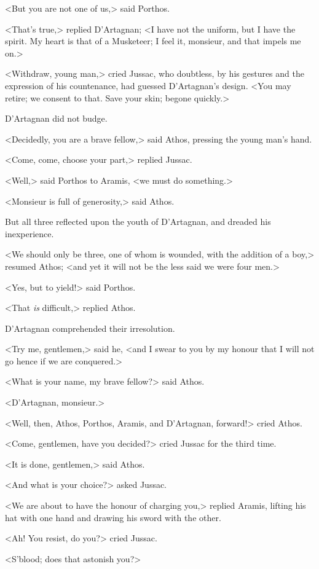 <But you are not one of us,> said Porthos. 

<That's true,> replied D'Artagnan; <I have not the uniform, but I have the spirit. My heart is that of a Musketeer; I feel it, monsieur, and that impels me on.> 

<Withdraw, young man,> cried Jussac, who doubtless, by his gestures and the expression of his countenance, had guessed D'Artagnan's design. <You may retire; we consent to that. Save your skin; begone quickly.> 

D'Artagnan did not budge. 

<Decidedly, you are a brave fellow,> said Athos, pressing the young man's hand. 

<Come, come, choose your part,> replied Jussac. 

<Well,> said Porthos to Aramis, <we must do something.> 

<Monsieur is full of generosity,> said Athos. 

But all three reflected upon the youth of D'Artagnan, and dreaded his inexperience. 

<We should only be three, one of whom is wounded, with the addition of a boy,> resumed Athos; <and yet it will not be the less said we were four men.> 

<Yes, but to yield!> said Porthos. 

<That \emph{is} difficult,> replied Athos. 

D'Artagnan comprehended their irresolution. 

<Try me, gentlemen,> said he, <and I swear to you by my honour that I will not go hence if we are conquered.> 

<What is your name, my brave fellow?> said Athos. 

<D'Artagnan, monsieur.> 

<Well, then, Athos, Porthos, Aramis, and D'Artagnan, forward!> cried Athos. 

<Come, gentlemen, have you decided?> cried Jussac for the third time. 

<It is done, gentlemen,> said Athos. 

<And what is your choice?> asked Jussac. 

<We are about to have the honour of charging you,> replied Aramis, lifting his hat with one hand and drawing his sword with the other. 

<Ah! You resist, do you?> cried Jussac. 

<S'blood; does that astonish you?> 

